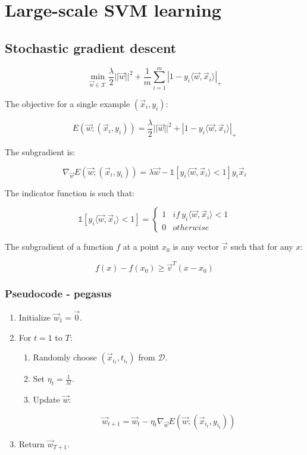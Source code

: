 \section{Large-scale SVM learning}

	\subsection{Stochastic gradient descent}

	$$\min\limits_{\vec{w}\in\mathcal{X}}\frac{\lambda}{2}||\vec{w}||^2+\frac{1}{m}\sum\limits_{i=1}^m|1-y_i\langle\vec{w},\vec{x}_i\rangle|_+$$

	The objective for a single example $(\vec{x}_i, y_i)$:

	$$E(\vec{w}; (\vec{x}_i, y_i)) = \frac{\lambda}{2}||\vec{w}||^2+|1-y_i\langle\vec{w},\vec{x}_i\rangle|_+$$

	The subgradient is:

	$$\nabla_{\vec{w}}E(\vec{w};(\vec{x}_i, y_i)) = \lambda\vec{w}-\mathbb{1}[y_i\langle\vec{w},\vec{x}_i\rangle < 1]y_i\vec{x}_i$$

	The indicator function is such that:

	$$\mathbb{1}[y_i\langle\vec{w}, \vec{x}_i\rangle< 1] = \begin{cases}1 &if\ y_i\langle\vec{w},\vec{x}_i\rangle < 1\\ 0 &otherwise\end{cases}$$

	The subgradient of a function $f$ at a point $x_0$ is any vector $\vec{v}$ such that for any $x$:

	$$f(x) - f(x_0)\ge \vec{v}^T(x-x_0)$$

		\subsubsection{Pseudocode - pegasus}

		\begin{enumerate}
			\item Initialize $\vec{w}_1 = \vec{0}$.
			\item For $t = 1 $ to $T$:
				\begin{enumerate}
					\item Randomly choose $(\vec{x}_{i_t}, t_{i_t})$ from $\mathcal{D}$.
					\item Set $\eta_t = \frac{1}{\lambda t}$.
					\item Update $\vec{w}$:

						$$\vec{w}_{t+1} = \vec{w}_t - \eta_t\nabla_{\vec{w}}E(\vec{w};(\vec{x}_{i_t}, y_{i_t}))$$

				\end{enumerate}
			\item Return $\vec{w}_{T+1}$.
		\end{enumerate}

